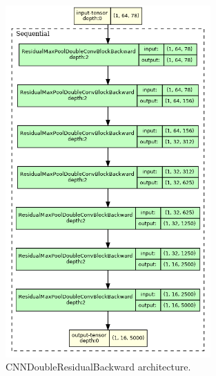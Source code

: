 \documentclass[a4paper,10pt]{article}
\begin{document}
\begin{figure}[p]
	\centering
	\includegraphics[width=0.7\textwidth]{CNNDoubleResidualBackward.gv.png}
	\caption{CNNDoubleResidualBackward architecture.}
	\label{fig:cnnbw_architecture}
\end{figure}
\end{document}
